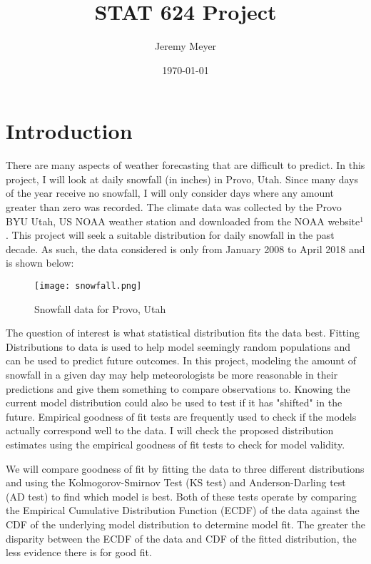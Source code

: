 \documentclass[letterpaper,12pt]{article}
\begin{document}
\title{STAT 624 Project}
\author{Jeremy Meyer}
\date{\today}
\maketitle



\section{Introduction}

There are many aspects of weather forecasting that are difficult to predict. In this project, I will look at daily snowfall (in inches) in Provo, Utah. Since many days of the year receive no snowfall, I will only consider days where any amount greater than zero was recorded. The climate data was collected by the Provo BYU Utah, US NOAA weather station and downloaded from the NOAA website$^1$. This project will seek a suitable distribution for daily snowfall in the past decade. As such, the data considered is only from January 2008 to April 2018 and is shown below: 
\begin{figure}[H]
    \caption{Snowfall data for Provo, Utah}
    \texttt{[image: snowfall.png]}
    \label{dat}
\end{figure}

The question of interest is what statistical distribution fits the data best. Fitting Distributions to data is used to help model seemingly random populations and can be used to predict future outcomes. In this project, modeling the amount of snowfall in a given day may help meteorologists be more reasonable in their predictions and give them something to compare observations to. Knowing the current model distribution could also be used to test if it has "shifted" in the future. Empirical goodness of fit tests are frequently used to check if the models actually correspond well to the data. I will check the proposed distribution estimates using the empirical goodness of fit tests to check for model validity.   

We will compare goodness of fit by fitting the data to three different distributions and using the Kolmogorov-Smirnov Test (KS test) and Anderson-Darling test (AD test) to find which model is best. Both of these tests operate by comparing the Empirical Cumulative Distribution Function (ECDF) of the data against the CDF of the underlying model distribution to determine model fit. The greater the disparity between the ECDF of the data and CDF of the fitted distribution, the less evidence there is for good fit. 
\end{document}
